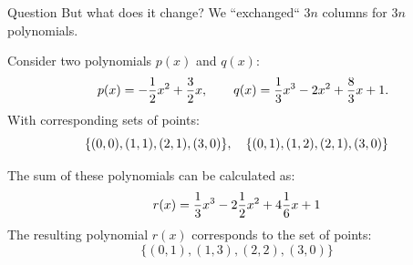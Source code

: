 \documentclass{zkdl-presentation-template}
\begin{document}
    \begin{frame}
        \begin{alertblock}{Question}
            But what does it change? We ``exchanged`` $3n$ columns for $3n$ polynomials.
        \end{alertblock}

        \pause
        \vspace{-5pt}
        Consider two polynomials $p(x)$ and $q(x)$:
        \begin{equation*}
            \quad p(x) = -\frac{1}{2}x^2 + \frac{3}{2}x, \qquad
            q(x) = \frac{1}{3}x^3 - 2x^2 + \frac{8}{3}x + 1.
            \vspace{-5pt}
        \end{equation*}
        With corresponding sets of points:
        \vspace{-5pt}
        \begin{equation*}
            \{(0, 0), (1, 1), (2, 1), (3, 0)\}, \quad \{(0, 1), (1, 2), (2, 1), (3, 0)\}
            \vspace{-10pt}
        \end{equation*}
        
        \pause
        The sum of these polynomials can be calculated as:
        \vspace{-5pt}
        \begin{equation*}
            r(x) = \frac{1}{3}x^3 - 2\frac{1}{2}x^2 + 4\frac{1}{6}x + 1
            \vspace{-5pt}
        \end{equation*}
        The resulting polynomial $r(x)$ corresponds to the set of points:
        \vspace{-5pt}
        \begin{equation*}
            \{(0, 1), (1, 3), (2, 2), (3, 0)\}
        \end{equation*}
    \end{frame}
\end{document}
